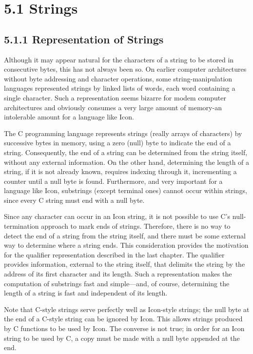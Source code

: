 \section[5.1 Strings]{5.1 Strings}
\subsection[5.1.1 Representation of Strings]{5.1.1 Representation of Strings}

Although it may appear natural for the characters of a string to be
stored in consecutive bytes, this has not always been so. On earlier
computer architectures without byte addressing and character
operations, some string-manipulation languages represented strings by
linked lists of words, each word containing a single character. Such a
representation seems bizarre for modem computer architectures and
obviously consumes a very large amount of memory-an intolerable amount
for a language like Icon.

The C programming language represents strings (really arrays of
characters) by successive bytes in memory, using a zero (null) byte to
indicate the end of a string. Consequently, the end of a string can be
determined from the string itself, without any external
information. On the other hand, determining the length of a string, if
it is not already known, requires indexing through it, incrementing a
counter until a null byte is found. Furthermore, and very important
for a language like Icon, substrings (except terminal ones) cannot
occur within strings, since every C string must end with a null byte.

Since any character can occur in an Icon string, it is not possible to
use C's null-termination approach to mark ends of strings. Therefore,
there is no way to detect the end of a string from the string itself,
and there must be some external way to determine where a string
ends. This consideration provides the motivation for the qualifier
representation described in the last chapter. The qualifier provides
information, external to the string itself, that delimits the string
by the address of its first character and its length. Such a
representation makes the computation of substrings fast and
simple---and, of course, determining the length of a string is
fast and independent of its length.

Note that C-style strings serve perfectly well as Icon-style strings;
the null byte at the end of a C-style string can be ignored by
Icon. This allows strings produced by C functions to be used by
Icon. The converse is not true; in order for an Icon string to be used
by C, a copy must be made with a null byte appended at the end.

